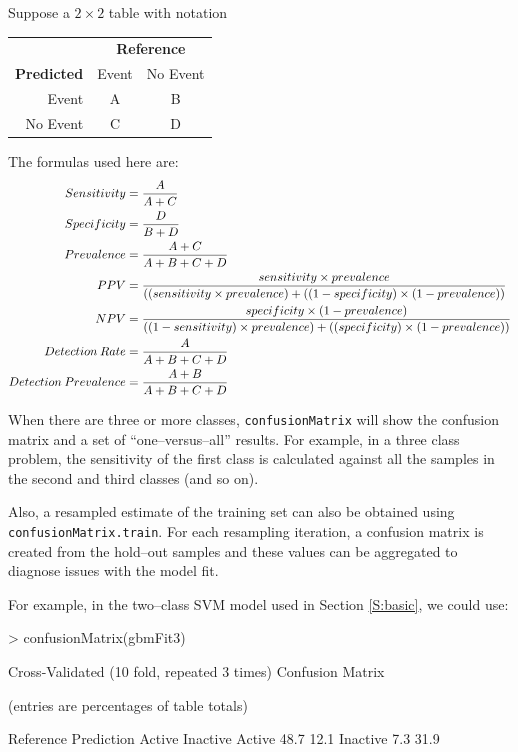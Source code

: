 \documentclass[12pt]{article}
\newcommand{\code}[1]{\mbox{\footnotesize\color{darkblue}\texttt{#1}}}
\renewenvironment{Schunk}{\vspace{\topsep}}{\vspace{\topsep}}
\begin{document}
Suppose a $2 \times 2$ table with notation

\begin{tabular}{r|c|c|}
                    & \multicolumn{2}{c}{{\bf Reference}}          \\
\cline{2-3}
         {\bf Predicted}  & Event     & No Event \\
\cline{2-3}
         Event      & A         & B        \\
\cline{2-3}
         No Event   & C         & D      \\
\cline{2-3}  
\end{tabular}

The formulas used here are:
\begin{align}
Sensitivity &= \frac{A}{A+C}\notag \\
Specificity &= \frac{D}{B+D}\notag \\
Prevalence &= \frac{A+C}{A+B+C+D}\notag \\
PPV &= \frac{sensitivity \times prevalence}{((sensitivity \times prevalence) + ((1-specificity) \times(1-prevalence))}\notag \\
NPV &= \frac{specificity \times (1-prevalence)}{((1-sensitivity) \times prevalence) + ((specificity) \times(1-prevalence))}\notag \\
Detection\: Rate &=  \frac{A}{A+B+C+D}\notag \\
Detection\: Prevalence &=  \frac{A + B}{A+B+C+D}\notag 
\end{align}

When there are three or more classes, \code{confusionMatrix} will
show the confusion matrix and a set of ``one--versus--all''
results. For example, in a three class problem, the sensitivity of the
first class is calculated against all the samples in the second and
third classes (and so on). 

Also, a resampled estimate of the training set can also be obtained
using \code{confusionMatrix.train}. For each resampling iteration,
a confusion matrix is created from the hold--out samples and these
values can be aggregated to diagnose issues with the model fit.

For example, in the two--class SVM model used in Section
\ref{S:basic}, we could use:

\begin{Schunk}
\begin{Sinput}
> confusionMatrix(gbmFit3)
\end{Sinput}
\begin{Soutput}
Cross-Validated (10 fold, repeated 3 times) Confusion Matrix 

(entries are percentages of table totals)
 
          Reference
Prediction Active Inactive
  Active     48.7     12.1
  Inactive    7.3     31.9
\end{Soutput}
\end{Schunk}
\end{document}
